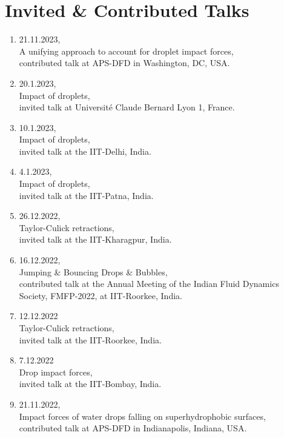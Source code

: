 \documentclass[11pt,a4paper,roman,english,colorlinks,linkcolor=true]{moderncv}
\begin{document}
\section{\textbf{Invited \& Contributed Talks}}
\begin{enumerate}[leftmargin=2.5cm]
	\item 21.11.2023,\\
	A unifying approach to account for droplet impact forces,\\
	contributed talk at APS-DFD in Washington, DC, USA.
	
	\item 20.1.2023,\\
	Impact of droplets,\\
	invited talk at Universit\'e Claude Bernard Lyon 1, France.
	
	\item 10.1.2023,\\
	Impact of droplets,\\
	invited talk at the IIT-Delhi, India.

	\item 4.1.2023,\\
	Impact of droplets,\\
	invited talk at the IIT-Patna, India.
	
	\item 26.12.2022,\\
	Taylor-Culick retractions,\\
	invited talk at the IIT-Kharagpur, India.
	
	\item 16.12.2022,\\
	Jumping \& Bouncing Drops \& Bubbles,\\
	contributed talk at the Annual Meeting of the Indian Fluid Dynamics Society, FMFP-2022, at IIT-Roorkee, India.
	
	\item 12.12.2022\\
	Taylor-Culick retractions,\\
	invited talk at the IIT-Roorkee, India.
	
	\item 7.12.2022\\
	Drop impact forces,\\
	invited talk at the IIT-Bombay, India.
	
	\item 21.11.2022,\\
	Impact forces of water drops falling on superhydrophobic surfaces,\\
	contributed talk at APS-DFD in Indianapolis, Indiana, USA.
	

\end{enumerate}
\end{document}
